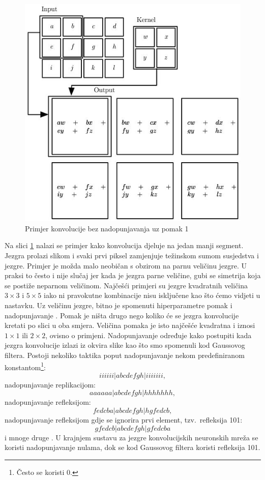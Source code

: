 \documentclass[times, utf8, diplomski]{fer}
\begin{document}
\begin{figure}[H]
    \centering
    \includegraphics[scale=0.5]{figures/detector/conv.jpg}
    \caption[Caption for LOF]{Primjer konvolucije bez nadopunjavanja uz pomak 1\footnotemark}
    \label{fig:conv}
\end{figure}

Na slici \ref{fig:conv} nalazi se primjer kako konvolucija djeluje na jedan manji segment. Jezgra prolazi slikom i svaki prvi piksel zamjenjuje težinskom sumom susjedstva i jezgre. Primjer je možda malo neobičan s obzirom na parnu veličinu jezgre. U praksi to često i nije slučaj jer kada je jezgra parne veličine, gubi se simetrija koja se postiže neparnom veličinom. Najčešći primjeri su jezgre kvadratnih veličina $3 \times 3$ i $5 \times 5$ iako ni pravokutne kombinacije nisu isključene kao što ćemo vidjeti u nastavku. Uz veličinu jezgre, bitno je spomenuti hiperparametre pomak  i nadopunjavanje . Pomak je ništa drugo nego koliko će se jezgra konvolucije kretati po slici u oba smjera. Veličina pomaka je isto najčešće kvadratna i iznosi $1 \times 1$ ili $2 \times 2$, ovisno o primjeni. Nadopunjavanje određuje kako postupiti kada jezgra konvolucije izlazi iz okvira slike kao što smo spomenuli kod Gaussovog filtera. Postoji nekoliko taktika poput nadopunjavanje nekom predefiniranom konstantom\footnote{Često se koristi 0.}:
\[iiiiii|abcdefgh|iiiiiii,\]
nadopunjavanje replikacijom:
\[aaaaaa|abcdefgh|hhhhhhh,\]
nadopunjavanje refleksijom:
\[fedcba|abcdefgh|hgfedcb,\]
nadopunjavanje refleksijom gdje se ignorira prvi element, tzv.\ refleksija 101:
\[gfedcb|abcdefgh|gfedcba\]
i mnoge druge \citep{szeliski}. U krajnjem sustavu za jezgre konvolucijskih neuronskih mreža se koristi nadopunjavanje nulama, dok se kod Gaussovog filtera koristi refleksija 101.
\end{document}
